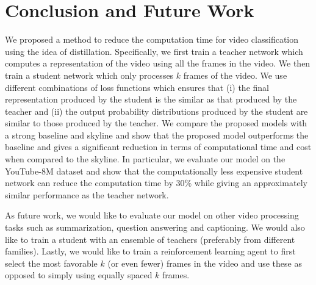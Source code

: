 \documentclass[10pt,twocolumn,letterpaper]{article}
\begin{document}
\section{Conclusion and Future Work}
We proposed a method to reduce the computation time for video classification using the idea of distillation. Specifically, we first train a teacher network which computes a representation of the video using all the frames in the video. We then train a student network which only processes $k$ frames of the video. We use different combinations of loss functions which ensures that (i) the final representation produced by the student is the similar as that produced by the teacher and (ii) the output probability distributions produced by the student are similar to those produced by the teacher. We compare the proposed models with a strong baseline and skyline and show that the proposed model outperforms the baseline and gives a significant reduction in terms of computational time and cost when compared to the skyline.
In particular, we evaluate our model on the YouTube-8M dataset and show that the computationally less expensive student network can reduce the computation time by $30\%$ while giving an approximately similar performance as the teacher network. 

As future work, we would like to evaluate our model on other video processing tasks such as summarization, question answering and captioning. We would also like to train a student with an ensemble of teachers (preferably from different families). Lastly, we would like to train a reinforcement learning agent to first select the most favorable $k$ (or even fewer) frames in the video and use these as opposed to simply using equally spaced $k$ frames.

\begin{comment}
\begin{tabular}{c|c|c}
\toprule
\textsc{Model}    & Student-Loss& CosSim\\
Serial & $L_{rep}$ &   0 \\
\midrule
Serial & $L_{rep}$,$L_{CE}$ &   0 \\
\midrule
Serial & $L_{rep}$,$L_{CE}$,$L_{pred}$ &   0 \\
\bottomrule
\end{tabular}
\end{comment}

{\small


}
\end{document}
